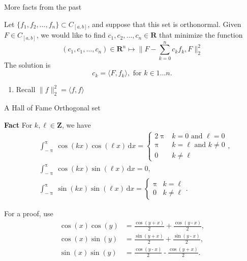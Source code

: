 \documentclass[portrait,fleqn,12pt]{beamer}
\newcommand{\reals}{\mathbf{R}}
\newcommand{\integers}{\mathbf{Z}}
\newenvironment{handlist}
   {\begin{enumerate}[\faHandPointRight]
       \addtolength{\itemsep}{0.0\itemsep}}
     {\end{enumerate}}
\begin{document}
\begin{frame}{More facts from the past}

Let  $\{f_1, f_2, \dots, f_n \} \subset C_{[a,b]}$, and suppose that this set is 
orthonormal. Given $F \in C_{[a,b]}$,
we would like to find $c_1, c_2, \dots, c_n \in \reals$ that minimize the function
\begin{equation}
  (c_1, c_1, \dots, c_n) \in \reals^n \mapsto \| F - \sum_{k=0}^n c_k f_k, F  \|_2^2
 \end{equation}
The solution is
\begin{equation}
   c_k  =  \langle F, f_k \rangle, \text{ for } k \in 1 \dots n.
\end{equation}
\begin{handlist}
\item Recall $\| f \|_2^2 = \langle f, f \rangle$
\end{handlist}
\end{frame}

\begin{frame}{A Hall of Fame Orthogonal set}

\textbf{Fact} For $k, \ell \in \integers$, we have
\begin{align*}
&\int_{-\uppi}^\uppi \cos(k x) \cos(\ell x) \, \mathrm{d} x = \begin{cases} 
  2 \uppi & k=0 \text{ and } \ell = 0 \\
  \uppi & k = \ell \text{ and } k \neq 0 \\ 0  & k \neq  \ell \end{cases},\\
&\int_{-\uppi}^\uppi \cos(k x) \sin(\ell x) \, \mathrm{d} x = 0, \\
&\int_{-\uppi}^\uppi \sin(k x) \sin(\ell x) \, \mathrm{d} x = \begin{cases} \uppi & k = \ell \\ 0  & k \neq  \ell \end{cases}.
\end{align*}


\end{frame}
\begin{frame}{For a proof, use}
  \begin{align*}
    \cos{(x)} \cos{(y)}&\operatorname{=}\frac{\cos{\left( y\operatorname{+}x\right) }}{2}\operatorname{+}\frac{\cos{\left( y\operatorname{-}x\right) }}{2},\\
    \cos{(x)} \sin{(y)}&\operatorname{=}\frac{\sin{\left( y\operatorname{+}x\right) }}{2}\operatorname{+}\frac{\sin{\left( y\operatorname{-}x\right) }}{2},\\
    \sin{(x)} \sin{(y)}&\operatorname{=}\frac{\cos{\left( y\operatorname{-}x\right) }}{2}\operatorname{-}\frac{\cos{\left( y\operatorname{+}x\right) }}{2}.
  \end{align*}
\end{frame}
\end{document}
